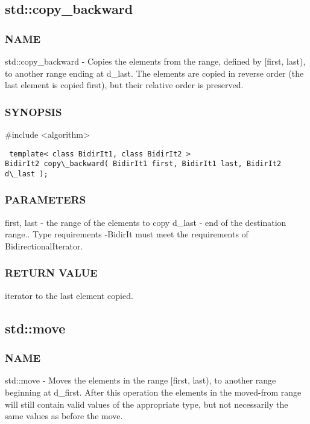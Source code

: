 \subsection{std::copy\_backward}

\subsubsection{NAME}
std::copy\_backward - Copies the elements from the range, defined by [first, last), to another range ending at d\_last. The elements are copied in reverse order (the last element is copied first), but their relative order is preserved.

\subsubsection{SYNOPSIS}
\#include <algorithm>

\begin{lstlisting}
 template< class BidirIt1, class BidirIt2 >
BidirIt2 copy\_backward( BidirIt1 first, BidirIt1 last, BidirIt2 d\_last );
\end{lstlisting}

\subsubsection{PARAMETERS}
first, last - the range of the elements to copy
d\_last - end of the destination range..
 Type requirements
 -BidirIt must meet the requirements of BidirectionalIterator.

\subsubsection{RETURN VALUE}
iterator to the last element copied.



\subsection{std::move}

\subsubsection{NAME}
std::move - Moves the elements in the range [first, last), to another range beginning at d\_first. After this operation the elements in the moved-from range will still contain valid values of the appropriate type, but not necessarily the same values as before the move.

